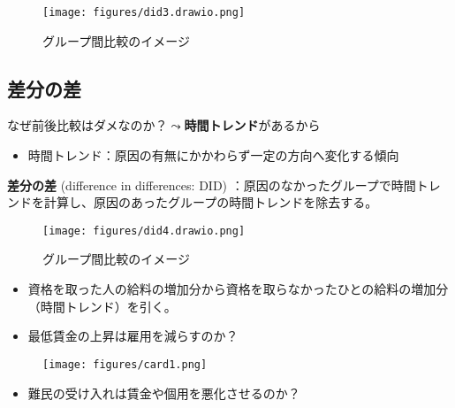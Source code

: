 \documentclass[
  xelatex,
  ja=standard]{bxjsarticle}
\providecommand{\tightlist}{%
  \setlength{\itemsep}{0pt}\setlength{\parskip}{0pt}}\usepackage{longtable,booktabs,array}
\begin{document}
\begin{figure}[htpb]

{\centering \texttt{[image: figures/did3.drawio.png]}

}

\caption{グループ間比較のイメージ}

\end{figure}

\hypertarget{ux5deeux5206ux306eux5dee-1}{%
\subsection{差分の差}\label{ux5deeux5206ux306eux5dee-1}}

なぜ前後比較はダメなのか？\(\leadsto\)\textbf{時間トレンド}があるから

\begin{itemize}
\tightlist
\item
  時間トレンド：原因の有無にかかわらず一定の方向へ変化する傾向
\end{itemize}

\textbf{差分の差} (difference in differences: DID)
：原因のなかったグループで時間トレンドを計算し、原因のあったグループの時間トレンドを除去する。

\begin{figure}[htpb]

{\centering \texttt{[image: figures/did4.drawio.png]}

}

\caption{グループ間比較のイメージ}

\end{figure}

\begin{itemize}
\tightlist
\item
  資格を取った人の給料の増加分から資格を取らなかったひとの給料の増加分（時間トレンド）を引く。
\item
  最低賃金の上昇は雇用を減らすのか？
\end{itemize}

\begin{figure}[htpb]

{\centering \texttt{[image: figures/card1.png]}

}

\caption{\citet{card1994}}

\end{figure}

\begin{itemize}
\tightlist
\item
  難民の受け入れは賃金や個用を悪化させるのか？
\end{itemize}
\end{document}
